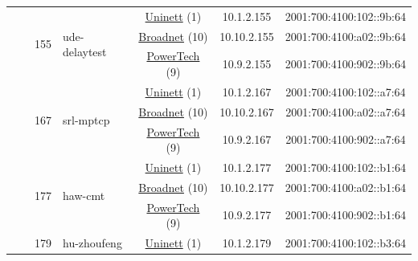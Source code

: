 \begin{small}
\begin{center}
\begin{longtable}{|c|c|c|c|c|c|c|c|}
  &  & \multirow{3}{*}{\tiny{155}} & \multicolumn{1}{|l|}{\multirow{3}{*}{\tiny{ude-delaytest}}} & \multicolumn{2}{|c|}{\tiny{\href{https://www.uninett.no}{Uninett} (1)}} & \tiny{10.1.2.155} & \tiny{2001:700:4100:102::9b:64} \\* \cline{5-5}\cline{6-6}\cline{7-7}\cline{8-8}
  &  &  &  & \multicolumn{2}{|c|}{\tiny{\href{https://www.broadnet.no}{Broadnet} (10)}} & \tiny{10.10.2.155} & \tiny{2001:700:4100:a02::9b:64} \\* \cline{5-5}\cline{6-6}\cline{7-7}\cline{8-8}
  &  &  &  & \multicolumn{2}{|c|}{\tiny{\href{http://www.powertech.no}{PowerTech} (9)}} & \tiny{10.9.2.155} & \tiny{2001:700:4100:902::9b:64} \\* \cline{3-3}\cline{4-4}\cline{5-5}\cline{6-6}\cline{7-7}\cline{8-8}
  &  & \multirow{3}{*}{\tiny{167}} & \multicolumn{1}{|l|}{\multirow{3}{*}{\tiny{srl-mptcp}}} & \multicolumn{2}{|c|}{\tiny{\href{https://www.uninett.no}{Uninett} (1)}} & \tiny{10.1.2.167} & \tiny{2001:700:4100:102::a7:64} \\* \cline{5-5}\cline{6-6}\cline{7-7}\cline{8-8}
  &  &  &  & \multicolumn{2}{|c|}{\tiny{\href{https://www.broadnet.no}{Broadnet} (10)}} & \tiny{10.10.2.167} & \tiny{2001:700:4100:a02::a7:64} \\* \cline{5-5}\cline{6-6}\cline{7-7}\cline{8-8}
  &  &  &  & \multicolumn{2}{|c|}{\tiny{\href{http://www.powertech.no}{PowerTech} (9)}} & \tiny{10.9.2.167} & \tiny{2001:700:4100:902::a7:64} \\* \cline{3-3}\cline{4-4}\cline{5-5}\cline{6-6}\cline{7-7}\cline{8-8}
  &  & \multirow{3}{*}{\tiny{177}} & \multicolumn{1}{|l|}{\multirow{3}{*}{\tiny{haw-cmt}}} & \multicolumn{2}{|c|}{\tiny{\href{https://www.uninett.no}{Uninett} (1)}} & \tiny{10.1.2.177} & \tiny{2001:700:4100:102::b1:64} \\* \cline{5-5}\cline{6-6}\cline{7-7}\cline{8-8}
  &  &  &  & \multicolumn{2}{|c|}{\tiny{\href{https://www.broadnet.no}{Broadnet} (10)}} & \tiny{10.10.2.177} & \tiny{2001:700:4100:a02::b1:64} \\* \cline{5-5}\cline{6-6}\cline{7-7}\cline{8-8}
  &  &  &  & \multicolumn{2}{|c|}{\tiny{\href{http://www.powertech.no}{PowerTech} (9)}} & \tiny{10.9.2.177} & \tiny{2001:700:4100:902::b1:64} \\* \cline{3-3}\cline{4-4}\cline{5-5}\cline{6-6}\cline{7-7}\cline{8-8}
  &  & \multirow{3}{*}{\tiny{179}} & \multicolumn{1}{|l|}{\multirow{3}{*}{\tiny{hu-zhoufeng}}} & \multicolumn{2}{|c|}{\tiny{\href{https://www.uninett.no}{Uninett} (1)}} & \tiny{10.1.2.179} & \tiny{2001:700:4100:102::b3:64} \\* \cline{5-5}\cline{6-6}\cline{7-7}\cline{8-8}

\end{longtable}
\end{center}
\end{small}
